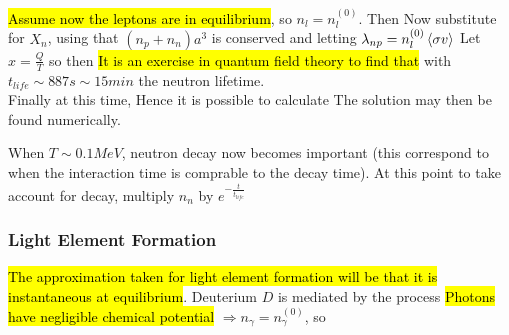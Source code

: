 \documentclass{article}
\begin{document}
\hl{Assume now the leptons are in equilibrium}, so $n_l = n_l^{(0)}$. Then 
Now substitute for $X_n$, using that $(n_p + n_n)a^3$ is conserved and letting $\lambda_{np}=n_l^{(0)} \braket{\sigma v}$
Let $x=\frac{Q}{T}$ so 
then 
\hl{It is an exercise in quantum field theory to find that }
with $t_{life} \sim 887s\sim 15min$ the neutron lifetime. \\
Finally at this time, 
Hence it is possible to calculate 
The solution may then be found numerically. 

\begin{remark}
When $T\sim 0.1 MeV$, neutron decay now becomes important (this correspond to when the interaction time is comprable to the decay time). At this point to take account for decay, multiply $n_n$ by $e^{-\frac{t}{t_{life}}}$
\end{remark}

\subsubsection*{Light Element Formation}
\hl{The approximation taken for light element formation will be that it is instantaneous at equilibrium}. Deuterium $D$ is mediated by the process 
\hl{Photons have negligible chemical potential} $\Rightarrow n_\gamma = n_\gamma^{(0)}$, so 
\end{document}

